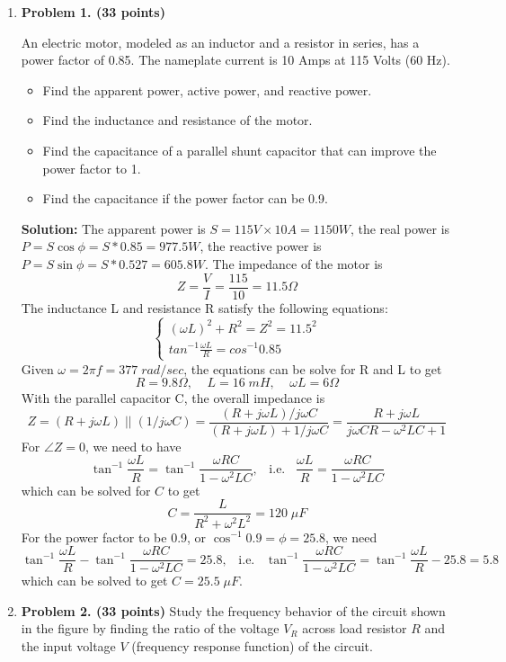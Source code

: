 \begin{enumerate}

\item {\bf Problem 1. (33 points)} 

An electric motor, modeled as an inductor and a resistor in series, has 
a power factor of 0.85. The nameplate current is 10 Amps at 115 Volts 
(60 Hz). 
\begin{itemize}
\item Find the apparent power, active power, and reactive power. 
\item Find the inductance and resistance of the motor.
\item Find the capacitance of a parallel shunt capacitor that can improve
	the power factor to 1.
\item Find the capacitance if the power factor can be 0.9.
\end{itemize}

{\bf Solution:} 
The apparent power is $S=115V \times 10A = 1150 W$, the real power is
$P=S\cos \phi=S*0.85=977.5 W$, the reactive power is 
$P=S\sin \phi=S*0.527=605.8 W$. The impedance of the motor is
\[	Z=\frac{V}{I}=\frac{115}{10}=11.5\Omega \]
The inductance L and resistance R satisfy the following equations:
\[ \left\{ \begin{array}{l} (\omega L)^2+R^2=Z^2=11.5^2 \\
	tan^{-1} \frac{\omega L}{R}=cos^{-1} 0.85 \end{array} \right. \]
Given $\omega=2\pi f=377\;rad/sec$, the equations can be solve for R and
L to get
\[	R=9.8\Omega,\;\;\;\;L=16\;mH,\;\;\;\;\omega L=6\Omega	\]
With the parallel capacitor C, the overall impedance is
\[	Z=(R+j\omega L)\; || \;(1/j\omega C)
	=\frac{(R+j\omega L)/j\omega C}{(R+j\omega L)+1/j\omega C}
	=\frac{R+j\omega L}{j\omega CR-\omega^2 LC+1}	\]
For $\angle Z=0$, we need to have
\[ \tan^{-1}\frac{\omega L}{R}=\tan^{-1}\frac{\omega RC}{1-\omega^2 LC},
	\;\;\;\mbox{i.e.}\;\;\;	
	\frac{\omega L}{R}=\frac{\omega RC}{1-\omega^2 LC}	\]
which can be solved for $C$ to get
\[	C=\frac{L}{R^2+\omega^2 L^2}=120\;\mu F	\]
For the power factor to be 0.9, or $\cos^{-1} 0.9=\phi=25.8$, we need
\[ \tan^{-1}\frac{\omega L}{R}-\tan^{-1}\frac{\omega RC}{1-\omega^2 LC}
	=25.8,	\;\;\;\mbox{i.e.}\;\;\;	
\tan^{-1}\frac{\omega RC}{1-\omega^2 LC}=\tan^{-1}\frac{\omega L}{R}-25.8=
	5.8 \]
which can be solved to get $C=25.5\;\mu F$.


\item {\bf Problem 2. (33 points)} Study the frequency behavior of the
  circuit shown in the figure by finding the ratio of the voltage $V_R$
  across load resistor $R$ and the input voltage $V$ (frequency response
  function) of the circuit. 


\end{enumerate}
